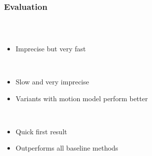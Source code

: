 \begin{frame}
\begin{columns}
\begin{column}{0.4\textwidth}
  \end{column}
  \end{columns}
\end{frame}

\begin{frame}
  \frametitle{Evaluation}
  \begin{columns}
  \begin{column}{0.6\textwidth}
  \begin{description}[]
  \item[Kalman Filter] \hfill \\
  \begin{itemize}
  \item Imprecise but very fast
  \end{itemize}
  \pause
  \item[ICP] \hfill \\
  \begin{itemize}
  \item Slow and very imprecise
  \item Variants with motion model perform better
  \end{itemize}
  \pause
  \item[ADH] \hfill \\
  \begin{itemize}
  \item Quick first result
  \item Outperforms all baseline methods
  \end{itemize}
  \end{description}
  \end{column}
  \begin{column}{0.5\textwidth}
\end{column}
\end{columns}
\end{frame}
